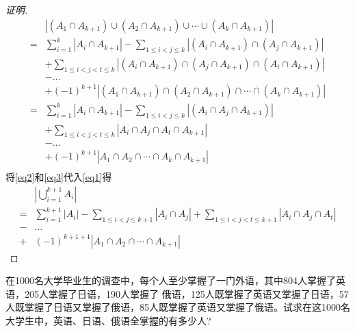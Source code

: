 \begin{proof}[证明]
  \begin{equation}\label{eq3}
    \begin{split}
      &|(A_1 \cap A_{k+1}) \cup (A_2 \cap A_{k+1}) \cup \cdots \cup (A_k \cap A_{k+1})|\\
      =&\sum_{i=1}^k|A_i \cap A_{k+1}| - \sum_{1\leq i < j \leq k}|(A_i \cap A_{k+1}) \cap (A_j \cap A_{k+1}) |\\
      &+ \sum_{1 \leq  i < j < t \leq k}|(A_i \cap A_{k+1}) \cap (A_j \cap A_{k+1}) \cap (A_t \cap A_{k+1})|\\
&-\ldots\\
&+(-1)^{k+1}|(A_1 \cap A_{k+1}) \cap (A_2 \cap A_{k+1}) \cap \cdots \cap (A_k \cap A_{k+1})| \\
      =&\sum_{i=1}^k|A_i \cap A_{k+1}| - \sum_{1\leq i < j \leq k}|(A_i  \cap A_j \cap A_{k+1}) |\\
      &+ \sum_{1 \leq  i < j < t \leq k}|A_i  \cap A_j  \cap A_t \cap A_{k+1}|\\
&-\ldots\\
&+(-1)^{k+1}|A_1  \cap A_2  \cap \cdots \cap A_k \cap A_{k+1}| \\
    \end{split}
  \end{equation}
    将\eqref{eq2}和\eqref{eq3}代入\eqref{eq1}得
  \begin{equation*}
    \begin{split}
    &|\bigcup_{i=1}^{k+1}A_i|\\
=&\sum_{i=1}^{k+1}|A_i| - \sum_{1\leq i < j \leq {k+1}}|A_i \cap A_j| + \sum_{1 \leq  i < j < t \leq {k+1}}|A_i \cap A_j \cap A_t|\\
-&\ldots\\
+&(-1)^{k+1+1}|A_1 \cap A_2 \cap \cdots \cap A_{k+1}|
\end{split}
\end{equation*}


\end{proof}
\begin{Example}
  在1000名大学毕业生的调查中，每个人至少掌握了一门外语，其中804人掌握了英语，205人掌握了日语，190人掌握了 俄语，125人既掌握了英语又掌握了日语，57人既掌握了日语又掌握了俄语，85人既掌握了英语又掌握了俄语。试求在这1000名大学生中，英语、日语、俄语全掌握的有多少人?
\end{Example}

